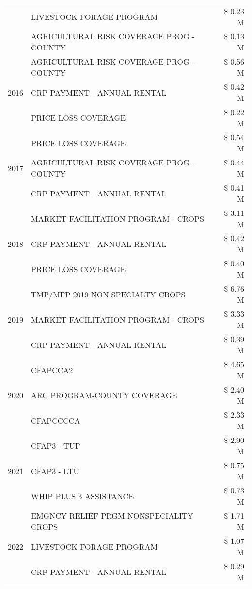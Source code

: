 \begin{tabular}{llr}
 & LIVESTOCK FORAGE PROGRAM & \$ 0.23 M \\
 & AGRICULTURAL RISK COVERAGE PROG - COUNTY & \$ 0.13 M \\
\cline{1-3}
\multirow[t]{3}{*}{2016} & AGRICULTURAL RISK COVERAGE PROG - COUNTY & \$ 0.56 M \\
 & CRP PAYMENT - ANNUAL RENTAL & \$ 0.42 M \\
 & PRICE LOSS COVERAGE & \$ 0.22 M \\
\cline{1-3}
\multirow[t]{3}{*}{2017} & PRICE LOSS COVERAGE & \$ 0.54 M \\
 & AGRICULTURAL RISK COVERAGE PROG - COUNTY & \$ 0.44 M \\
 & CRP PAYMENT - ANNUAL RENTAL & \$ 0.41 M \\
\cline{1-3}
\multirow[t]{3}{*}{2018} & MARKET FACILITATION PROGRAM - CROPS & \$ 3.11 M \\
 & CRP PAYMENT - ANNUAL RENTAL & \$ 0.42 M \\
 & PRICE LOSS COVERAGE & \$ 0.40 M \\
\cline{1-3}
\multirow[t]{3}{*}{2019} & TMP/MFP 2019 NON SPECIALTY CROPS & \$ 6.76 M \\
 & MARKET FACILITATION PROGRAM - CROPS & \$ 3.33 M \\
 & CRP PAYMENT - ANNUAL RENTAL & \$ 0.39 M \\
\cline{1-3}
\multirow[t]{3}{*}{2020} & CFAPCCA2 & \$ 4.65 M \\
 & ARC PROGRAM-COUNTY COVERAGE & \$ 2.40 M \\
 & CFAPCCCCA & \$ 2.33 M \\
\cline{1-3}
\multirow[t]{3}{*}{2021} & CFAP3 - TUP & \$ 2.90 M \\
 & CFAP3 - LTU & \$ 0.75 M \\
 & WHIP PLUS 3 ASSISTANCE & \$ 0.73 M \\
\cline{1-3}
\multirow[t]{3}{*}{2022} & EMGNCY RELIEF PRGM-NONSPECIALITY CROPS & \$ 1.71 M \\
 & LIVESTOCK FORAGE PROGRAM & \$ 1.07 M \\
 & CRP PAYMENT - ANNUAL RENTAL & \$ 0.29 M \\
\cline{1-3}
\bottomrule
\end{tabular}
